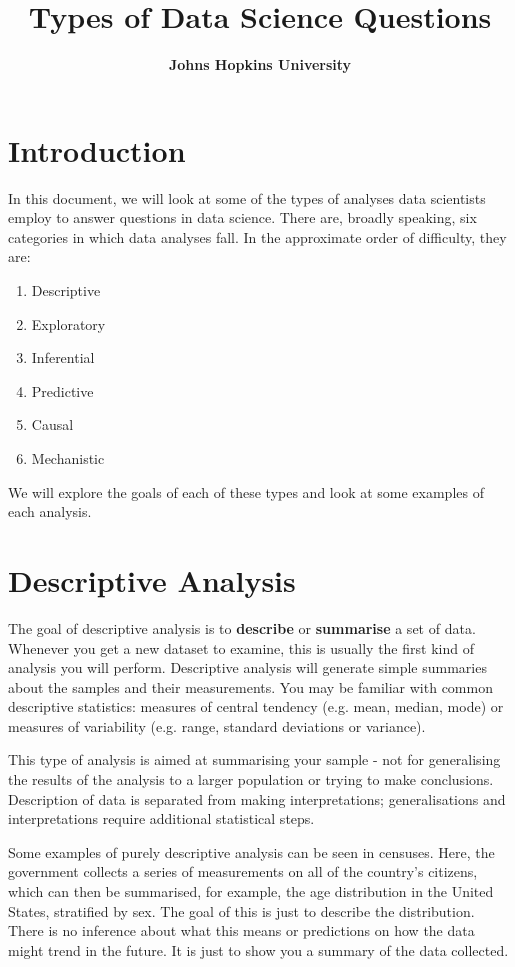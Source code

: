 \documentclass[10pt,a4paper,twoside]{article}\usepackage[]{graphicx}\usepackage[]{xcolor}
\title{\Large \textbf{Types of Data Science Questions}}
\author{\large \textbf{Johns Hopkins University}}
\begin{document}
\maketitle
\tableofcontents
\newpage

\section{Introduction}

In this document, we will look at some of the types of analyses data scientists employ to answer questions in data science. There are, broadly speaking, six categories in which data analyses fall. In the approximate order of difficulty, they are:

\begin{enumerate}
  \item Descriptive
  \item Exploratory
  \item Inferential
  \item Predictive
  \item Causal
  \item Mechanistic
\end{enumerate}

We will explore the goals of each of these types and look at some examples of each analysis.

\section{Descriptive Analysis}

The goal of descriptive analysis is to \textbf{describe} or \textbf{summarise} a set of data. Whenever you get a new dataset to examine, this is usually the first kind of analysis you will perform. Descriptive analysis will generate simple summaries about the samples and their measurements. You may be familiar with common descriptive statistics: measures of central tendency (e.g. mean, median, mode) or measures of variability (e.g. range, standard deviations or variance).

This type of analysis is aimed at summarising your sample - not for generalising the results of the analysis to a larger population or trying to make conclusions. Description of data is separated from making interpretations; generalisations and interpretations require additional statistical steps.

Some examples of purely descriptive analysis can be seen in censuses. Here, the government collects a series of measurements on all of the country's citizens, which can then be summarised, for example, the age distribution in the United States, stratified by sex. The goal of this is just to describe the distribution. There is no inference about what this means or predictions on how the data might trend in the future. It is just to show you a summary of the data collected.
\end{document}

